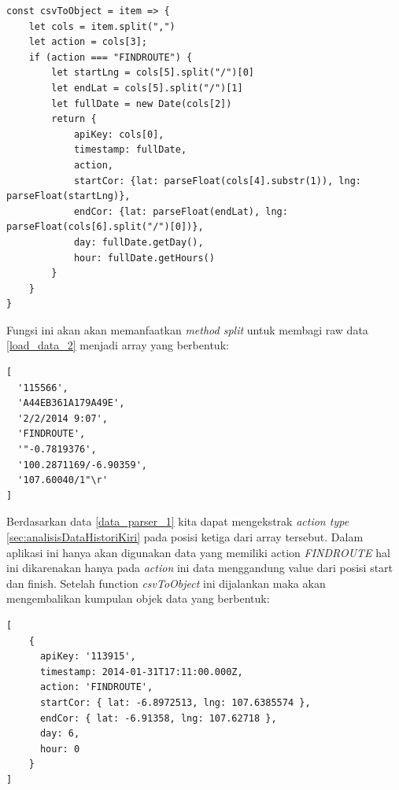 \begin{lstlisting}[label=helper_1 , caption=CSV Mapper]
const csvToObject = item => {
    let cols = item.split(",")
    let action = cols[3];
    if (action === "FINDROUTE") {
        let startLng = cols[5].split("/")[0]
        let endLat = cols[5].split("/")[1]
        let fullDate = new Date(cols[2])
        return {
            apiKey: cols[0],
            timestamp: fullDate,
            action,
            startCor: {lat: parseFloat(cols[4].substr(1)), lng: parseFloat(startLng)},
            endCor: {lat: parseFloat(endLat), lng: parseFloat(cols[6].split("/")[0])},
            day: fullDate.getDay(),
            hour: fullDate.getHours()
        }
    }
}
\end{lstlisting}

Fungsi ini akan akan memanfaatkan \textit{method split} untuk membagi raw data \ref{load_data_2} menjadi array yang berbentuk:

\begin{lstlisting}[label=data_parser_1 , caption=Data Split Result]
[
  '115566',
  'A44EB361A179A49E',
  '2/2/2014 9:07',
  'FINDROUTE',
  '"-0.7819376',
  '100.2871169/-6.90359',
  '107.60040/1"\r'
]

\end{lstlisting}
Berdasarkan data \ref{data_parser_1} kita dapat mengekstrak  \textit{action type} \ref{sec:analisisDataHistoriKiri} pada posisi ketiga dari array tersebut. Dalam aplikasi ini hanya akan digunakan data yang memiliki action \textit{FINDROUTE} hal ini dikarenakan hanya pada \textit{action} ini data menggandung value dari posisi start dan finish. Setelah function \textit{csvToObject} ini dijalankan maka akan mengembalikan kumpulan objek data yang berbentuk:

\begin{lstlisting}[label=data_parser_result , caption=Result Data]
[
    {
      apiKey: '113915',
      timestamp: 2014-01-31T17:11:00.000Z,
      action: 'FINDROUTE',
      startCor: { lat: -6.8972513, lng: 107.6385574 },
      endCor: { lat: -6.91358, lng: 107.62718 },
      day: 6,
      hour: 0
    }
]
\end{lstlisting}


